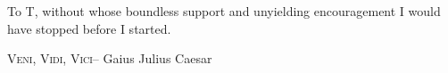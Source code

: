 \newcommand{\centertext}[1]{%
  	\par
	\vspace*{\fill}
	\begin{center}
    #1
    \end{center}
	\vfill
}

\frontmatter

\maketitle

\newpage
\centertext{\begin{minipage}{.6\textwidth}\raggedright To T, without whose boundless support and unyielding encouragement I would have stopped before I started.\end{minipage}}

\newpage
\centertext{{\Large\textsc{Veni, Vidi, Vici}}\linebreak\linebreak -- Gaius Julius Caesar}

\restoregeometry

\tableofcontents